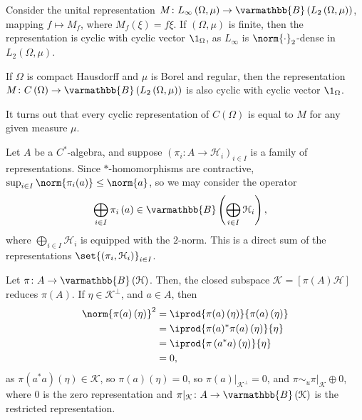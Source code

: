 \documentclass[10pt]{mypackage}
\renewcommand*{\mathbb}[1]{\varmathbb{#1}}
\newcommand{\B}{\mathbb{B}}
\begin{document}
\begin{example}
  Consider the unital representation $M\colon L_{\infty}\left(\Omega,\mu\right)\rightarrow \B\left(L_2\left(\Omega,\mu\right)\right)$, mapping $f \mapsto M_f$, where $M_f\left(\xi\right) = f\xi$. If $\left(\Omega,\mu\right)$ is finite, then the representation is cyclic with cyclic vector $\1_{\Omega}$, as $L_{\infty}$ is $\norm{\cdot}_2$-dense in $L_2\left(\Omega,\mu\right)$.\newline

  If $\Omega$ is compact Hausdorff and $\mu$ is Borel and regular, then the representation $M\colon C\left(\Omega\right)\rightarrow \B\left(L_2\left(\Omega,\mu\right)\right)$ is also cyclic with cyclic vector $\1_{\Omega}$.\newline

  It turns out that every cyclic representation of $C\left(\Omega\right)$ is equal to $M$ for any given measure $\mu$.
\end{example}
\begin{example}
  Let $A$ be a $C^{\ast}$-algebra, and suppose $\left(\pi_i\colon A\rightarrow \mathcal{H}_i\right)_{i\in I}$ is a family of representations. Since $\ast$-homomorphisms are contractive, $\sup_{i\in I}\norm{\pi_i(a)}\leq \norm{a}$, so we may consider the operator
  \begin{align*}
    \bigoplus_{i\in I}\pi_i\left(a\right) &\in \B\left(\bigoplus_{i\in I}\mathcal{H}_i\right),
  \end{align*}
  where $\bigoplus_{i\in I}\mathcal{H}_i$ is equipped with the $2$-norm. This is a direct sum of the representations $\set{\left(\pi_i,\mathcal{H}_i\right)}_{i\in I}$.
\end{example}
\begin{example}
  Let $\pi\colon A\rightarrow \B\left(\mathcal{H}\right)$. Then, the closed subspace $\mathcal{K} = \left[\pi(A)\mathcal{H}\right]$ reduces $\pi(A)$. If $\eta\in \mathcal{K}^{\perp}$, and $a\in A$, then
  \begin{align*}
    \norm{\pi(a)\left(\eta\right)}^2 &= \iprod{\pi(a)\left(\eta\right)}{\pi(a)\left(\eta\right)}\\
                                     &= \iprod{\pi(a)^{\ast}\pi(a)\left(\eta\right)}{\eta}\\
                                     &= \iprod{\pi\left(a^{\ast}a\right)\left(\eta\right)}{\eta}\\
                                     &= 0,
  \end{align*}
  as $\pi\left(a^{\ast}a\right)\left(\eta\right) \in \mathcal{K}$, so $\pi\left(a\right)\left(\eta\right) = 0$, so $\pi(a)|_{\mathcal{K}^{\perp}} = 0$, and $\pi\sim_{u}\pi|_{\mathcal{K}}\oplus 0$, where $0$ is the zero representation and $\pi|_{\mathcal{K}}\colon A\rightarrow \B\left(\mathcal{K}\right)$ is the restricted representation.
\end{example}
\end{document}
